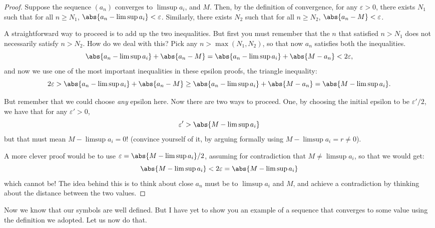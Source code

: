 \begin{proof}
	Suppose the sequence $(a_n)$ converges to $\limsup a_i$, and $M$. Then, by the
	definition of convergence, for any $\varepsilon > 0$, there exists $N_1$ such that for all $n \geq N_1$, $\abs{a_n - \limsup a_i} < \varepsilon$.
	Similarly, there exists $N_2$ such that for all $n \geq N_2$, $\abs{a_n - M} < \varepsilon$.

	A straightforward way to proceed is to add up the two inequalities. But first
	you must remember that the $n$ that satisfied $n > N_1$ does not necessarily satisfy $n > N_2$.
	How do we deal with this? Pick any $n > \max(N_1, N_2)$, so that now $a_n$ satisfies
	both the inequalities.
	\[
	\abs{a_n - \limsup a_i} + \abs{a_n - M} = \abs{a_n - \limsup a_i} + \abs{M - a_n} < 2\varepsilon,
	\]
	and now we use one of the most important inequalities in these epsilon proofs, the triangle inequality:
	\[
	2\varepsilon > \abs{a_n - \limsup a_i} + \abs{a_n - M} \ge \abs{a_n - \limsup a_i} + \abs{M - a_n} = \abs{M - \limsup a_i}.
	\]

	But remember that we could choose \emph{any} epsilon here. Now there are two ways to proceed.
	One, by choosing the initial
	epsilon to be $\varepsilon'/2$, we have that for any $\varepsilon' > 0$,
	\[
	\varepsilon' > \abs{M - \limsup a_i}
	\]
	but that must mean $M - \limsup a_i = 0$! (convince yourself of it, by arguing formally using
	$M-\limsup a_i = r \neq 0$).

	A more clever proof would be to use $\varepsilon = \abs{M - \limsup a_i}/2$, assuming for contradiction
	that $M \neq \limsup a_i$, so that we would get:
	\[
	 \abs{M - \limsup a_i} < 2\varepsilon = \abs{M - \limsup a_i}
	\]
	which cannot be! The idea behind this is to think about close $a_n$ must be to
	$\limsup a_i$ and $M$, and achieve a contradiction by thinking about the distance between
	the two values.
\end{proof}

Now we know that our symbols are well defined. But I have yet to show you an example
of a sequence that converges to some value using the definition we adopted. Let us
now do that.

